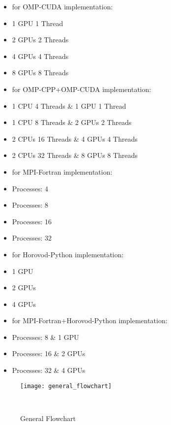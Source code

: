 \begin{itemize}
\begin{itemize}
            \item for OMP-CUDA implementation:
            \item 1 GPU 1 Thread
            \item 2 GPUs 2 Threads
            \item 4 GPUs 4 Threads
            \item 8 GPUs 8 Threads
        \end{itemize}
        \begin{itemize}
            \item for OMP-CPP+OMP-CUDA implementation:
            \item 1 CPU 4 Threads \& 1 GPU 1 Thread
            \item 1 CPU 8 Threads \& 2 GPUs 2 Threads
            \item 2 CPUs 16 Threads \& 4 GPUs 4 Threads
            \item 2 CPUs 32 Threads \& 8 GPUs 8 Threads
        \end{itemize}
        \begin{itemize}
            \item for MPI-Fortran implementation:
            \item Processes: 4
            \item Processes: 8
            \item Processes: 16
            \item Processes: 32
        \end{itemize}
        \begin{itemize}
            \item for Horovod-Python implementation:
            \item 1 GPU
            \item 2 GPUs
            \item 4 GPUs
        \end{itemize}
        \begin{itemize}
            \item for MPI-Fortran+Horovod-Python implementation:
            \item Processes: 8 \& 1 GPU
            \item Processes: 16 \& 2 GPUs
            \item Processes: 32 \& 4 GPUs
        \end{itemize}
\end{itemize}

\begin{figure}[hbtp]
    \centering
    \texttt{[image: general\_flowchart]}
    \caption{General Flowchart}~\label{fig:general_flowchart}
\end{figure}

